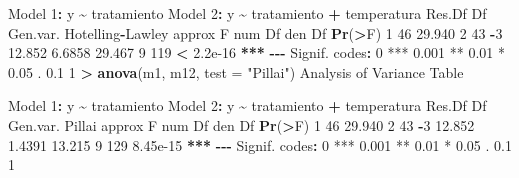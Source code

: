 \documentclass[
  a4paper,
  oneside]{scrbook}
\newenvironment{Shaded}{\begin{snugshade}}{\end{snugshade}}
\newcommand{\AttributeTok}[1]{\textcolor[rgb]{0.13,0.29,0.53}{#1}}
\newcommand{\DecValTok}[1]{\textcolor[rgb]{0.00,0.00,0.81}{#1}}
\newcommand{\ErrorTok}[1]{\textcolor[rgb]{0.64,0.00,0.00}{\textbf{#1}}}
\newcommand{\FloatTok}[1]{\textcolor[rgb]{0.00,0.00,0.81}{#1}}
\newcommand{\FunctionTok}[1]{\textcolor[rgb]{0.13,0.29,0.53}{\textbf{#1}}}
\newcommand{\NormalTok}[1]{#1}
\newcommand{\SpecialCharTok}[1]{\textcolor[rgb]{0.81,0.36,0.00}{\textbf{#1}}}
\newcommand{\StringTok}[1]{\textcolor[rgb]{0.31,0.60,0.02}{#1}}
\theoremstyle{definition}
\theoremstyle{definition}
\theoremstyle{definition}
\theoremstyle{definition}
\theoremstyle{remark}
\begin{document}
\begin{Shaded}
\begin{Highlighting}[]
\NormalTok{Model }\DecValTok{1}\SpecialCharTok{:}\NormalTok{ y }\SpecialCharTok{\textasciitilde{}}\NormalTok{ tratamiento}
\NormalTok{Model }\DecValTok{2}\SpecialCharTok{:}\NormalTok{ y }\SpecialCharTok{\textasciitilde{}}\NormalTok{ tratamiento }\SpecialCharTok{+}\NormalTok{ temperatura}
\NormalTok{  Res.Df Df Gen.var. Hotelling}\SpecialCharTok{{-}}\NormalTok{Lawley approx F num Df den Df    }\FunctionTok{Pr}\NormalTok{(}\SpecialCharTok{\textgreater{}}\NormalTok{F)    }
\DecValTok{1}     \DecValTok{46}      \FloatTok{29.940}                                                      
\DecValTok{2}     \DecValTok{43} \SpecialCharTok{{-}}\DecValTok{3}   \FloatTok{12.852}           \FloatTok{6.6858}   \FloatTok{29.467}      \DecValTok{9}    \DecValTok{119} \SpecialCharTok{\textless{}} \FloatTok{2.2e{-}16} \SpecialCharTok{**}\ErrorTok{*}
\SpecialCharTok{{-}{-}{-}}
\NormalTok{Signif. codes}\SpecialCharTok{:}  \DecValTok{0} \StringTok{\textquotesingle{}***\textquotesingle{}} \FloatTok{0.001} \StringTok{\textquotesingle{}**\textquotesingle{}} \FloatTok{0.01} \StringTok{\textquotesingle{}*\textquotesingle{}} \FloatTok{0.05} \StringTok{\textquotesingle{}.\textquotesingle{}} \FloatTok{0.1} \StringTok{\textquotesingle{} \textquotesingle{}} \DecValTok{1}
\SpecialCharTok{\textgreater{}} \FunctionTok{anova}\NormalTok{(m1, m12, }\AttributeTok{test =} \StringTok{"Pillai"}\NormalTok{)}
\NormalTok{Analysis of Variance Table}

\NormalTok{Model }\DecValTok{1}\SpecialCharTok{:}\NormalTok{ y }\SpecialCharTok{\textasciitilde{}}\NormalTok{ tratamiento}
\NormalTok{Model }\DecValTok{2}\SpecialCharTok{:}\NormalTok{ y }\SpecialCharTok{\textasciitilde{}}\NormalTok{ tratamiento }\SpecialCharTok{+}\NormalTok{ temperatura}
\NormalTok{  Res.Df Df Gen.var. Pillai approx F num Df den Df   }\FunctionTok{Pr}\NormalTok{(}\SpecialCharTok{\textgreater{}}\NormalTok{F)    }
\DecValTok{1}     \DecValTok{46}      \FloatTok{29.940}                                           
\DecValTok{2}     \DecValTok{43} \SpecialCharTok{{-}}\DecValTok{3}   \FloatTok{12.852} \FloatTok{1.4391}   \FloatTok{13.215}      \DecValTok{9}    \DecValTok{129} \FloatTok{8.45e{-}15} \SpecialCharTok{**}\ErrorTok{*}
\SpecialCharTok{{-}{-}{-}}
\NormalTok{Signif. codes}\SpecialCharTok{:}  \DecValTok{0} \StringTok{\textquotesingle{}***\textquotesingle{}} \FloatTok{0.001} \StringTok{\textquotesingle{}**\textquotesingle{}} \FloatTok{0.01} \StringTok{\textquotesingle{}*\textquotesingle{}} \FloatTok{0.05} \StringTok{\textquotesingle{}.\textquotesingle{}} \FloatTok{0.1} \StringTok{\textquotesingle{} \textquotesingle{}} \DecValTok{1}
\end{Highlighting}
\end{Shaded}
\end{document}
